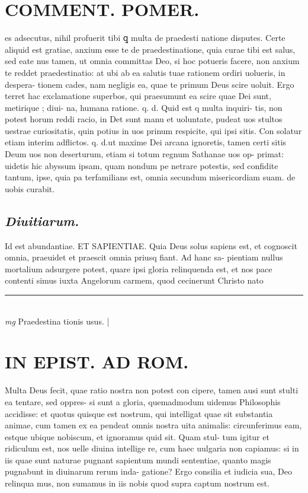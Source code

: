 \documentclass{article}
\begin{document}
\begin{pages}
\section*{COMMENT. POMER.  }\pstart es adsecutus, nihil profuerit tibi ꝗ multa de praedesti natione disputes. Certe aliquid est gratiae, anxium esse te de praedestinatione, quia curae tibi est salus, sed eate nus tamen, ut omnia committas Deo, si hoc potueris facere, non anxium te reddet praedestinatio: at ubi ab ea salutis tuae rationem ordiri uolueris, in despera- tionem cades, nam negligis ea, quae te primum Deus scire uoluit. Ergo terret hac exclamatione superbos, qui praesumunt ea scire quae Dei sunt, metirique ; diui- na, humana ratione. q. d. Quid est q multa inquiri- tis, non potest horum reddi racio, in Det sunt manu et uoluntate, pudeat uos stultos uestrae curiositatis, quin potius in uos prinum respicite, qui ipsi sitis. Con solatur etiam interim adflictos. q. d.ut maxime Dei arcana ignoretis, tamen certi sitis Deum uos non deserturum, etiam si totum regnum Sathanae uos op- primat: uidetis hic abyssum ipsam, quam nondum pe netrare potestis, sed confidite tantum, ipse, quia pa terfamilians est, omnia secundum misericordiam suam. de uobis curabit.  \pend
{}
{}
\subsection*{\textit{Diuitiarum. }}\pstart Id est abundantiae. ET SAPIENTIAE.  Quia Deus solus sapiens est, et cognoscit omnia, praeuidet et praescit omnia priusq fiant. Ad hanc sa- pientiam nullus mortalium adsurgere potest, quare ipsi gloria relinquenda est, et nos pace contenti simus iuxta Angelorum carmem, quod cecinerunt Christo nato  \pend
\vspace{0.5cm}\noindent
\vspace{0.2cm}\rule{1cm}{0.2pt}\\ 
\hspace{0.2cm}\textit{mg}
\footnotesize Praedestina tionis usus.  
\normalsize| 
\section*{IN EPIST. AD ROM.  }
\marginpar{[ p.u7 ]}\pstart Multa Deus fecit, quae ratio nostra non potest con cipere, tamen ausi sunt stulti ea tentare, sed oppres- si sunt a gloria, quemadmodum uidemus Philosophis accidisse: et quotus quisque est nostrum, qui intelligat quae sit substantia animae, cum tamen ex ea pendeat omnis nostra uita animalis: circunferimus eam, estque  ubique nobiscum, et ignoramus quid sit. Quam stul- tum igitur et ridiculum est, nos uelle diuina intellige re, cum haec uulgaria non capiamus: si in iis quae sunt naturae pugnant sapientum mundi sententiae, quanto magis pugnabunt in diuinarum rerum inda- gatione? Ergo consilia et iudicia sua, Deo relinqua mus, non sumamus in iis nobis quod supra captum nostrum est.   \pend
{}
{}

\end{pages}
\end{document}
